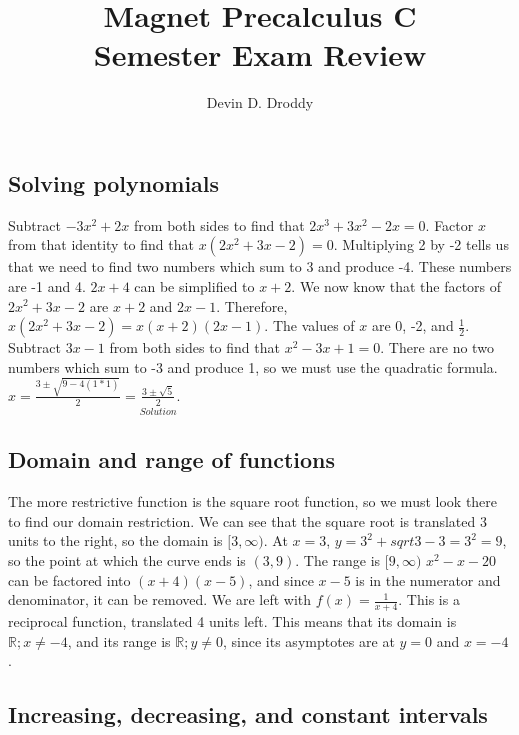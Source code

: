 \documentclass{report}
\title{\Huge{Magnet Precalculus C}\\Semester Exam Review}
\author{\huge{Devin D. Droddy}}
\date{}
\begin{document}
\maketitle
\newpage%
\tableofcontents
\pagebreak

\chapter{}
\section{Solving polynomials}
\sol Subtract \(-3x^2+2x\) from both sides to find that \(2x^3+3x^2-2x=0\). Factor \(x\) from that identity to find that \(x(2x^2+3x-2)=0\). Multiplying 2 by -2 tells us that we need to find two numbers which sum to 3 and produce -4. These numbers are -1 and 4. \(2x+4\) can be simplified to \(x+2\). We now know that the factors of \(2x^2+3x-2\) are \(x+2\) and \(2x-1\). Therefore, \(x(2x^2+3x-2)=x(x+2)(2x-1)\). The values of \(x\) are 0, -2, and \(\frac{1}{2}\).
\sol Subtract \(3x-1\) from both sides to find that \(x^2-3x+1=0\). There are no two numbers which sum to -3 and produce 1, so we must use the quadratic formula. \(x=\frac{3\pm\sqrt{9-4(1*1)}}{2}=\underset{Solution}{\boxed{\frac{3\pm\sqrt{5}}{2}}}\).
\section{Domain and range of functions}
\sol The more restrictive function is the square root function, so we must look there to find our domain restriction. We can see that the square root is translated 3 units to the right, so the domain is \([3,\infty)\). At \(x=3\), \(y=3^2+sqrt{3-3}=3^2=9\), so the point at which the curve ends is \((3, 9)\). The range is \([9,\infty)\)
\sol \(x^2-x-20\) can be factored into \((x+4)(x-5)\), and since \(x-5\) is in the numerator and denominator, it can be removed. We are left with \(f(x)=\frac{1}{x+4}\). This is a reciprocal function, translated 4 units left. This means that its domain is \(\mathbb{R};x\neq -4\), and its range is \(\mathbb{R};y\neq 0\), since its asymptotes are at \(y=0\) and \(x=-4\).
\section{Increasing, decreasing, and constant intervals}
\end{document}
